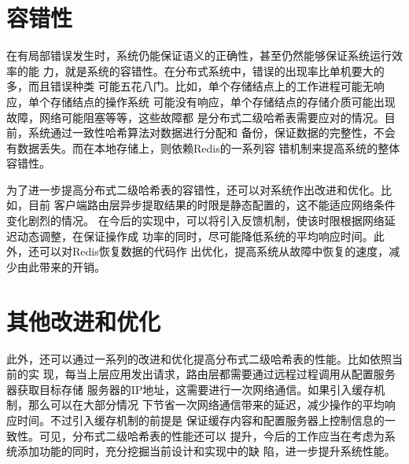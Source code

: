 \section{容错性}
在有局部错误发生时，系统仍能保证语义的正确性，甚至仍然能够保证系统运行效率的能
力，就是系统的容错性。在分布式系统中，错误的出现率比单机要大的多，而且错误种类
可能五花八门。比如，单个存储结点上的工作进程可能无响应，单个存储结点的操作系统
可能没有响应，单个存储结点的存储介质可能出现故障，网络可能阻塞等等，这些故障都
是分布式二级哈希表需要应对的情况。目前，系统通过一致性哈希算法对数据进行分配和
备份，保证数据的完整性，不会有数据丢失。而在本地存储上，则依赖Redis的一系列容
错机制来提高系统的整体容错性。

为了进一步提高分布式二级哈希表的容错性，还可以对系统作出改进和优化。比如，目前
客户端路由层异步提取结果的时限是静态配置的，这不能适应网络条件变化剧烈的情况。
在今后的实现中，可以将引入反馈机制，使该时限根据网络延迟动态调整，在保证操作成
功率的同时，尽可能降低系统的平均响应时间。此外，还可以对Redis恢复数据的代码作
出优化，提高系统从故障中恢复的速度，减少由此带来的开销。

\section{其他改进和优化}
此外，还可以通过一系列的改进和优化提高分布式二级哈希表的性能。比如依照当前的实
现，每当上层应用发出请求，路由层都需要通过远程过程调用从配置服务器获取目标存储
服务器的IP地址，这需要进行一次网络通信。如果引入缓存机制，那么可以在大部分情况
下节省一次网络通信带来的延迟，减少操作的平均响应时间。不过引入缓存机制的前提是
保证缓存内容和配置服务器上控制信息的一致性。可见，分布式二级哈希表的性能还可以
提升，今后的工作应当在考虑为系统添加功能的同时，充分挖掘当前设计和实现中的缺
陷，进一步提升系统性能。
